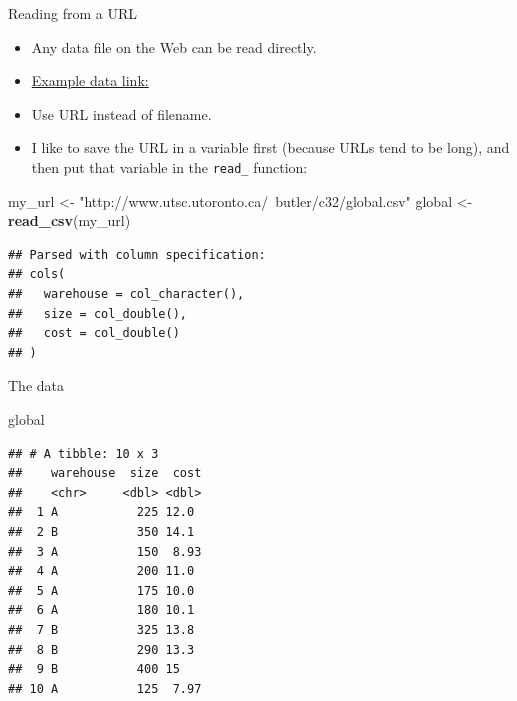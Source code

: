 \documentclass[
  ignorenonframetext,
]{beamer}
\newenvironment{Shaded}{\begin{snugshade}}{\end{snugshade}}
\newcommand{\KeywordTok}[1]{\textcolor[rgb]{0.13,0.29,0.53}{\textbf{#1}}}
\newcommand{\NormalTok}[1]{#1}
\newcommand{\StringTok}[1]{\textcolor[rgb]{0.31,0.60,0.02}{#1}}
\providecommand{\tightlist}{%
  \setlength{\itemsep}{0pt}\setlength{\parskip}{0pt}}
\begin{document}
\begin{frame}[fragile]{Reading from a URL}
\protect\hypertarget{reading-from-a-url}{}

\begin{itemize}
\tightlist
\item
  Any data file on the Web can be read directly.
\item
  \href{http://www.utsc.utoronto.ca/~butler/c32/global.csv}{Example data
  link:}
\item
  Use URL instead of filename.
\item
  I like to save the URL in a variable first (because URLs tend to be
  long), and then put that variable in the \texttt{read\_} function:
\end{itemize}

\small

\begin{Shaded}
\begin{Highlighting}[]
\NormalTok{my_url <-}\StringTok{ "http://www.utsc.utoronto.ca/~butler/c32/global.csv"}
\NormalTok{global <-}\StringTok{ }\KeywordTok{read_csv}\NormalTok{(my_url)}
\end{Highlighting}
\end{Shaded}

\begin{verbatim}
## Parsed with column specification:
## cols(
##   warehouse = col_character(),
##   size = col_double(),
##   cost = col_double()
## )
\end{verbatim}

\normalsize

\end{frame}

\begin{frame}[fragile]{The data}
\protect\hypertarget{the-data}{}

\begin{Shaded}
\begin{Highlighting}[]
\NormalTok{global}
\end{Highlighting}
\end{Shaded}

\begin{verbatim}
## # A tibble: 10 x 3
##    warehouse  size  cost
##    <chr>     <dbl> <dbl>
##  1 A           225 12.0 
##  2 B           350 14.1 
##  3 A           150  8.93
##  4 A           200 11.0 
##  5 A           175 10.0 
##  6 A           180 10.1 
##  7 B           325 13.8 
##  8 B           290 13.3 
##  9 B           400 15   
## 10 A           125  7.97
\end{verbatim}

\end{frame}
\end{document}
